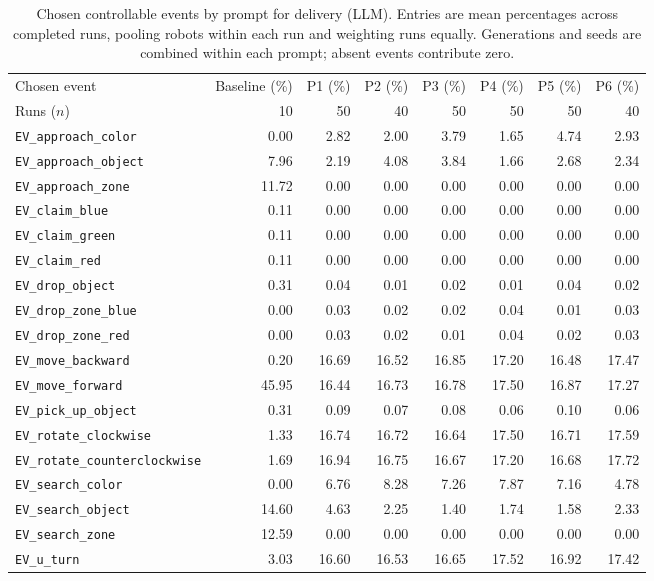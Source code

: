 \begin{table}[htbp]
\centering
\small
\caption{Chosen controllable events by prompt for delivery (LLM). Entries are mean percentages across completed runs, pooling robots within each run and weighting runs equally. Generations and seeds are combined within each prompt; absent events contribute zero.}
\label{tab:delivery-without-fixed-spec-prompt-events}
\begin{tabular}{lrrrrrrr}
\hline
Chosen event & Baseline (\%) & P1 (\%) & P2 (\%) & P3 (\%) & P4 (\%) & P5 (\%) & P6 (\%) \\
Runs ($n$) & 10 & 50 & 40 & 50 & 50 & 50 & 40 \\
\hline
\texttt{EV\_approach\_color} & 0.00 & 2.82 & 2.00 & 3.79 & 1.65 & 4.74 & 2.93 \\
\texttt{EV\_approach\_object} & 7.96 & 2.19 & 4.08 & 3.84 & 1.66 & 2.68 & 2.34 \\
\texttt{EV\_approach\_zone} & 11.72 & 0.00 & 0.00 & 0.00 & 0.00 & 0.00 & 0.00 \\
\texttt{EV\_claim\_blue} & 0.11 & 0.00 & 0.00 & 0.00 & 0.00 & 0.00 & 0.00 \\
\texttt{EV\_claim\_green} & 0.11 & 0.00 & 0.00 & 0.00 & 0.00 & 0.00 & 0.00 \\
\texttt{EV\_claim\_red} & 0.11 & 0.00 & 0.00 & 0.00 & 0.00 & 0.00 & 0.00 \\
\texttt{EV\_drop\_object} & 0.31 & 0.04 & 0.01 & 0.02 & 0.01 & 0.04 & 0.02 \\
\texttt{EV\_drop\_zone\_blue} & 0.00 & 0.03 & 0.02 & 0.02 & 0.04 & 0.01 & 0.03 \\
\texttt{EV\_drop\_zone\_red} & 0.00 & 0.03 & 0.02 & 0.01 & 0.04 & 0.02 & 0.03 \\
\texttt{EV\_move\_backward} & 0.20 & 16.69 & 16.52 & 16.85 & 17.20 & 16.48 & 17.47 \\
\texttt{EV\_move\_forward} & 45.95 & 16.44 & 16.73 & 16.78 & 17.50 & 16.87 & 17.27 \\
\texttt{EV\_pick\_up\_object} & 0.31 & 0.09 & 0.07 & 0.08 & 0.06 & 0.10 & 0.06 \\
\texttt{EV\_rotate\_clockwise} & 1.33 & 16.74 & 16.72 & 16.64 & 17.50 & 16.71 & 17.59 \\
\texttt{EV\_rotate\_counterclockwise} & 1.69 & 16.94 & 16.75 & 16.67 & 17.20 & 16.68 & 17.72 \\
\texttt{EV\_search\_color} & 0.00 & 6.76 & 8.28 & 7.26 & 7.87 & 7.16 & 4.78 \\
\texttt{EV\_search\_object} & 14.60 & 4.63 & 2.25 & 1.40 & 1.74 & 1.58 & 2.33 \\
\texttt{EV\_search\_zone} & 12.59 & 0.00 & 0.00 & 0.00 & 0.00 & 0.00 & 0.00 \\
\texttt{EV\_u\_turn} & 3.03 & 16.60 & 16.53 & 16.65 & 17.52 & 16.92 & 17.42 \\
\hline
\end{tabular}
\end{table}

